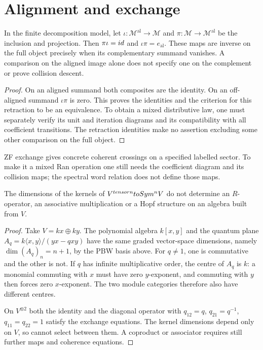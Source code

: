 \section{Alignment and exchange}
\begin{proposition}
\label{prop:lambda-sector-spine}
In the finite decomposition model, let
$\iota:\mathcal M^{\mathrm{al}}\to\mathcal M$ and
$\pi:\mathcal M\to\mathcal M^{\mathrm{al}}$ be the inclusion and projection.
Then $\pi\iota=id$ and $\iota\pi=e_{\mathrm{al}}$.
These maps are inverse on the full object precisely when its complementary
summand vanishes. A comparison on the aligned image alone does not specify
one on the complement or prove collision descent.
\end{proposition}
\begin{proof}
On an aligned summand both composites are the identity.
On an off-aligned summand $\iota\pi$ is zero.
This proves the identities and the criterion for this retraction to be an equivalence.
To obtain a mixed distributive law, one must separately verify its unit and
iteration diagrams and its compatibility with all coefficient transitions.
The retraction identities make no assertion excluding some other comparison
on the full object.
\end{proof}

ZF exchange gives concrete coherent crossings on a specified labelled sector.
To make it a mixed Ran operation one still needs the coefficient diagram and
its collision maps; the spectral word relation does not define those maps.

\begin{theorem}
\label{nogo:dimension-loss-spine}
The dimensions of the kernels of $V^{tensor n}toSym^nV$ do not determine
an $R$-operator, an associative multiplication or a Hopf structure on an algebra
built from $V$.
\end{theorem}
\begin{proof}
Take $V=kx\oplus ky$. The polynomial algebra $k[x,y]$ and the quantum plane
$A_q=k\langle x,y\rangle/(yx-qxy)$ have the same graded vector-space dimensions,
namely $\dim(A_q)_n=n+1$, by the PBW basis above.
For $q\ne1$, one is commutative and the other is not.
If $q$ has infinite multiplicative order, the centre of $A_q$ is $k$:
a monomial commuting with $x$ must have zero $y$-exponent, and commuting with
$y$ then forces zero $x$-exponent. The two module categories therefore also
have different centres.

On $V^{\otimes2}$ both the identity and the diagonal operator with
$q_{12}=q$, $q_{21}=q^{-1}$, $q_{11}=q_{22}=1$ satisfy the exchange equations.
The kernel dimensions depend only on $V$, so cannot select between them.
A coproduct or associator requires still further maps and coherence equations.
\end{proof}

